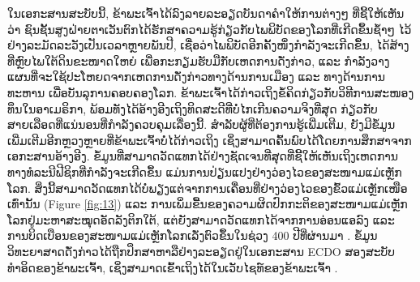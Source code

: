 \documentclass[10pt,twocolumn,letterpaper]{article}
\begin{document}
ໃນເອກະສານສະບັບນີ້, ຂ້າພະເຈົ້າໄດ້ລົງລາຍລະອຽດບັນດາຄຳໃຫ້ການຕ່າງໆ ທີ່ຊີ້ໃຫ້ເຫັນວ່າ ຊົນຊັ້ນສູງຝ່າຍຕາເວັນຕົກໄດ້ຮັກສາຄວາມຮູ້ກ່ຽວກັບໄພພິບັດຂອງໂລກທີ່ເກີດຂຶ້ນຊ້ຳໆ ໄວ້ຢ່າງລະມັດລະວັງເປັນເວລາຫຼາຍພັນປີ, ເຊື່ອວ່າໄພພິບັດອີກຄັ້ງໜຶ່ງກຳລັງຈະເກີດຂຶ້ນ, ໄດ້ສ້າງທີ່ຫຼົບໄພໃຕ້ດິນຂະໜາດໃຫຍ່ ເພື່ອກະກຽມຮັບມືກັບເຫດການດັ່ງກ່າວ, ແລະ ກຳລັງວາງແຜນທີ່ຈະໃຊ້ປະໂຫຍດຈາກເຫດການດັ່ງກ່າວທາງດ້ານການເມືອງ ແລະ ທາງດ້ານການທະຫານ ເພື່ອບັນລຸການຄອບຄອງໂລກ. \cite{169}
ຂ້າພະເຈົ້າໄດ້ກ່າວເຖິງຂໍ້ຄິດກ່ຽວກັບວິທີການສະໜອງທຶນໃນອາເມຣິກາ, ພ້ອມທັງໄດ້ອ້າງອີງເຖິງທິດສະດີທີ່ບໍ່ໄກເກີນຄວາມຈິງທີ່ສຸດ ກ່ຽວກັບສາຍເລືອດທີ່ແນ່ນອນທີ່ກຳລັງຄວບຄຸມເລື່ອງນີ້. \cite{170}
ສຳລັບຜູ້ທີ່ຕ້ອງການຮູ້ເພີ່ມເຕີມ, ຍັງມີຂໍ້ມູນເພີ່ມເຕີມອີກຫຼວງຫຼາຍທີ່ຂ້າພະເຈົ້າບໍ່ໄດ້ກ່າວເຖິງ ເຊິ່ງສາມາດຄົ້ນພົບໄດ້ໂດຍການສຶກສາຈາກເອກະສານອ້າງອີງ. \cite{171}
ຂໍ້ມູນທີ່ສາມາດວັດແທກໄດ້ຢ່າງຊັດເຈນທີ່ສຸດທີ່ຊີ້ໃຫ້ເຫັນເຖິງເຫດການທາງທໍລະນີຟີຊິກທີ່ກຳລັງຈະເກີດຂຶ້ນ ແມ່ນການປ່ຽນແປງຢ່າງວ່ອງໄວຂອງສະໜາມແມ່ເຫຼັກໂລກ. \cite{172}
ສິ່ງນີ້ສາມາດວັດແທກໄດ້ບໍ່ພຽງແຕ່ຈາກການເຄື່ອນທີ່ຢ່າງວ່ອງໄວຂອງຂົ້ວແມ່ເຫຼັກເໜືອເທົ່ານັ້ນ (Figure \ref{fig:13}) ແລະ ການເພິ່ມຂື້ນຂອງຄວາມຜິດປົກກະຕິຂອງສະໜາມແມ່ເຫຼັກໂລກຢູ່ມະຫາສະໝຸດອັດລັງຕິກໃຕ້, ແຕ່ຍັງສາມາດວັດແທກໄດ້ຈາກການອ່ອນແອລົງ ແລະ ການບິດເບືອນຂອງສະໜາມແມ່ເຫຼັກໂລກເລັ່ງຕົວຂຶ້ນໃນຊ່ວງ 400 ປີທີ່ຜ່ານມາ \cite{3}. \cite{173}
ຂໍ້ມູນວິທະຍາສາດດັ່ງກ່າວໄດ້ຖືກປຶກສາຫາລືຢ່າງລະອຽດຢູ່ໃນເອກະສານ ECDO ສອງສະບັບທຳອິດຂອງຂ້າພະເຈົ້າ, ເຊິ່ງສາມາດເຂົ້າເຖິງໄດ້ໃນເວັບໄຊທ໌ຂອງຂ້າພະເຈົ້າ \cite{3}. \cite{174}
\end{document}

